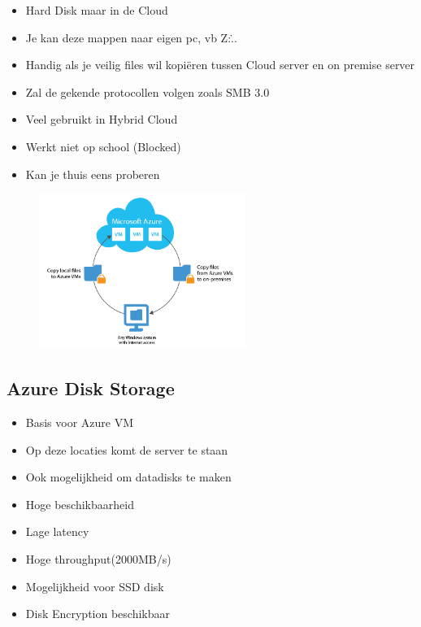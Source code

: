 \documentclass{article}
\begin{document}
\begin{itemize}
    \item  Hard Disk maar in de Cloud
    \item  Je kan deze mappen naar eigen pc, vb Z:\...
    \item  Handig als je veilig files wil kopiëren tussen Cloud server en on premise server
    \item  Zal de gekende protocollen volgen zoals SMB 3.0
    \item  Veel gebruikt in Hybrid Cloud
    \item  Werkt niet op school (Blocked)
    \item  Kan je thuis eens proberen
\end{itemize}

\begin{figure}[H]
    \centering
    \includegraphics[width=0.6\textwidth]{azure-storage-files.png}
    \caption{}
\end{figure}


\subsection{Azure Disk Storage}

\begin{itemize}
    \item Basis voor Azure VM
    \item Op deze locaties komt de server te staan
    \item Ook mogelijkheid om datadisks te maken
    \item Hoge beschikbaarheid
    \item Lage latency
    \item Hoge throughput(2000MB/s)
    \item Mogelijkheid voor SSD disk
    \item Disk Encryption
    beschikbaar
\end{itemize}
\end{document}
